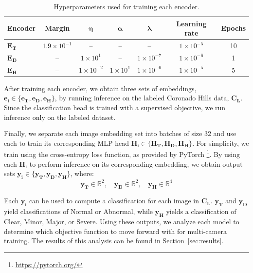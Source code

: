 \documentclass[remotesensing,article,submit,moreauthors]{Definitions/mdpi}
\begin{document}
\begin{table}[H]
\centering

\caption{Hyperparameters used for training each encoder.}
\label{tab:hyperparams}

\begin{tabular}{lcccccc}
\toprule
\textbf{Encoder} & \textbf{Margin} & $\boldsymbol{\eta}$ & $\boldsymbol{\alpha}$ & $\boldsymbol{\lambda}$ & \textbf{Learning rate} & \textbf{Epochs} \\
\midrule

$\mathbf{E_T}$ & $1.9 \times 10^{-1}$ & -- & -- & -- & $1 \times 10^{-5}$ & 10 \\
$\mathbf{E_D}$ & -- & $1 \times 10^{1}$ & -- & $1 \times 10^{-7}$ & $1 \times 10^{-6}$ & 1 \\
$\mathbf{E_H}$ & -- & $1 \times 10^{-2}$ & $1 \times 10^{1}$ & $1 \times 10^{-6}$ & $1 \times 10^{-5}$ & 5 \\

\bottomrule
\end{tabular}

\end{table}


After training each encoder, we obtain three sets of embeddings, $\mathbf{e_i} \in  \{\mathbf{e_T}, \mathbf{e_D}, \mathbf{e_H}\}$, by running inference on the labeled Coronado Hills data, $\mathbf{C_L}$. Since the classification head is trained with a supervised objective, we run inference only on the labeled dataset. 

Finally, we separate each image embedding set into batches of size 32 and use each to train its corresponding \ac{MLP} head $\mathbf{H_i} \in \{\mathbf{H_T}, \mathbf{H_D}, \mathbf{H_H}\}$. For simplicity, we train using the cross-entropy loss function, as provided by PyTorch \footnote{\url{https://pytorch.org/}}. By using each $\mathbf{H_i}$ to perform inference on its corresponding embedding, we obtain output sets $\mathbf{y_i} \in \{\mathbf{y_T}, \mathbf{y_D}, \mathbf{y_H}\}$, where:
\[\mathbf{y_T} \in \mathbb{R}^2, \quad \mathbf{y_D} \in \mathbb{R}^2, \quad\mathbf{y_H} \in \mathbb{R}^4\]

Each $\mathbf{y_i}$ can be used to compute a classification for each image in $\mathbf{C_L}$. $\mathbf{y_T}$ and $\mathbf{y_D}$ yield classifications of Normal or Abnormal, while $\mathbf{y_H}$ yields a classification of Clear, Minor, Major, or Severe. Using these outputs, we analyze each model to determine which objective function to move forward with for multi-camera training. The results of this analysis can be found in Section~\ref{sec:results}.
\end{document}
